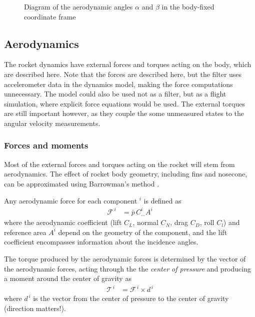 \begin{figure}[ht]
    \centering
    \resizebox{0.25\textwidth}{!}{
    }
    \caption[Diagram of the aerodynamic angles]{Diagram of the aerodynamic angles $\alpha$ and $\beta$ in the body-fixed coordinate frame}
    \label{fig:model_alpha-beta}
\end{figure}


\subsection{Aerodynamics}
The rocket dynamics have external forces and torques acting on the body, which are described here.
Note that the forces are described here, but the filter uses accelerometer data in the dynamics model, making the force computations unnecessary. 
The model could also be used not as a filter, but as a flight simulation, where explicit force equations would be used.
The external torques are still important however, as they couple the some unmeasured states to the angular velocity measurements.

\subsubsection{Forces and moments}
Most of the external forces and torques acting on the rocket will stem from aerodynamics.
The effect of rocket body geometry, including fins and nosecone, can be approximated using Barrowman's method \cite{barrowman1967}.

Any aerodynamic force for each component $^i$ is defined as 
\begin{align}
    \mathcal{F}^{\,i} &= \bar p \, C^i_{...} A^i 
\end{align}
where the aerodynamic coefficient (lift $C_L$, normal $C_N$, drag $C_D$, roll $C_l$) and reference area $A^i$ depend on the geometry of the component, and the lift coefficient encompasses information about the incidence angles. 

The torque produced by the aerodynamic forces is determined by the vector of the aerodynamic forces, acting through the the \textit{center of pressure} and producing a moment around the center of gravity as 
\begin{align}
    \mathcal{T}^{\, i} &= \mathcal{F}^{\, i} \times d^{\, i}
\end{align}
where $d^{\, i}$ is the vector from the center of pressure to the center of gravity (direction matters!).



